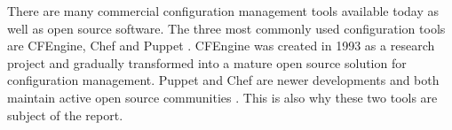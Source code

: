 

There are many commercial configuration management tools available today as well as open source software. The three most commonly used configuration tools are CFEngine, Chef and Puppet \cite{pandey2012investigating}. CFEngine was created in 1993 as a research project and gradually transformed into a mature open source solution for configuration management\cite{Zamboni:2012:LCA:2341102}. Puppet and Chef are newer developments and both maintain active open source communities \cite{pandey2012investigating}. This is also why these two tools are subject of the report.
